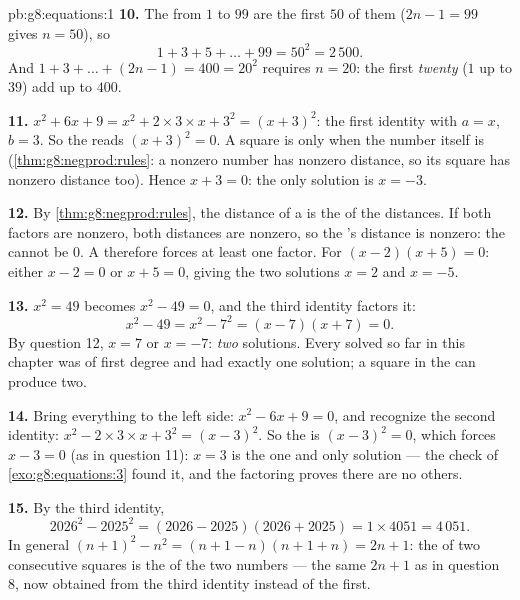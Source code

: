 \begin{solution}{pb:g8:equations:1}
\textbf{10.} The  from $1$ to $99$ are the first $50$
of them ($2n - 1 = 99$ gives $n = 50$), so
\[
1 + 3 + 5 + \dots + 99 = 50^2 = 2\,500 .
\]
And $1 + 3 + \dots + (2n - 1) = 400 = 20^2$ requires $n = 20$:
the first \emph{twenty}  ($1$ up to $39$) add up to
$400$.

\textbf{11.} $x^2 + 6x + 9 = x^2 + 2 \times 3 \times x + 3^2 =
(x + 3)^2$: the first identity with $a = x$, $b = 3$. So the
 reads $(x + 3)^2 = 0$. A square is  only when the
number itself is  (\cref{thm:g8:negprod:rules}: a nonzero
number has nonzero distance, so its square has nonzero distance
too). Hence $x + 3 = 0$: the only solution is $x = -3$.

\textbf{12.} By \cref{thm:g8:negprod:rules}, the distance of a
 is the  of the distances. If both factors are
nonzero, both distances are nonzero, so the 's distance is
nonzero: the  cannot be $0$. A   therefore
forces at least one  factor. For $(x - 2)(x + 5) = 0$: either
$x - 2 = 0$ or $x + 5 = 0$, giving the two solutions $x = 2$ and
$x = -5$.

\textbf{13.} $x^2 = 49$ becomes $x^2 - 49 = 0$, and the third
identity factors it:
\[
x^2 - 49 = x^2 - 7^2 = (x - 7)(x + 7) = 0 .
\]
By question 12, $x = 7$ or $x = -7$: \emph{two} solutions. Every
 solved so far in this chapter was of first degree and
had exactly one solution; a square in the  can produce
two.

\textbf{14.} Bring everything to the left side:
$x^2 - 6x + 9 = 0$, and recognize the second identity:
$x^2 - 2 \times 3 \times x + 3^2 = (x - 3)^2$. So the  is
$(x - 3)^2 = 0$, which forces $x - 3 = 0$ (as in question 11):
$x = 3$ is the one and only solution --- the check of
\cref{exo:g8:equations:3} found it, and the factoring proves
there are no others.

\textbf{15.} By the third identity,
\[
2026^2 - 2025^2 = (2026 - 2025)(2026 + 2025)
= 1 \times 4051 = 4\,051 .
\]
In general $(n+1)^2 - n^2 = (n + 1 - n)(n + 1 + n) = 2n + 1$: the
 of two consecutive squares is the  of the two
numbers --- the same $2n + 1$ as in question 8, now obtained from
the third identity instead of the first.
\end{solution}
